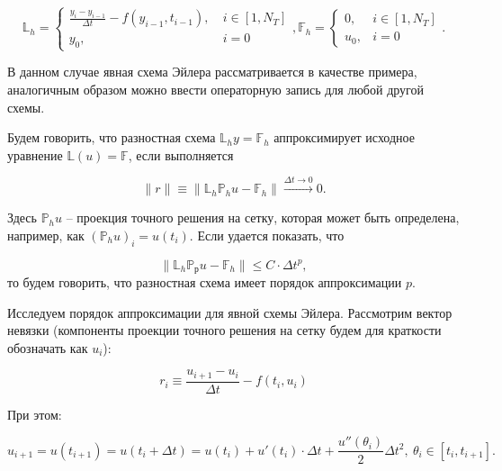 \documentclass[10pt,a4paper]{article}
\begin{document}
	\begin{equation}
		\mathbb{L}_{h} = 
		\begin{cases}
			\frac{y_{i} - y_{i-1}}{\Delta t} - {f}\left(y_{i-1}, t_{i-1}
			\right), \ &i \in \left[1, N_T\right]
			\\
			y_{0}, \  &i = 0
		\end{cases},
		\mathbb{F}_{h} = 
		\begin{cases}
		0, &i \in \left[1, N_T\right]
		\\
		u_{0}, &i = 0
		\end{cases}.
	\end{equation}
	
	В данном случае явная схема Эйлера рассматривается в качестве примера, 
	аналогичным образом можно ввести операторную запись
	для любой другой схемы. 
	
	Будем говорить, что разностная схема $\mathbb{L}_h y =\mathbb{F}_h$ 
	аппроксимирует исходное уравнение $\mathbb{L}\left(u\right)=\mathbb{F}$,
	если выполняется
	
	\begin{equation}
	\parallel r \parallel \equiv 
	\parallel \mathbb{L}_{h}\mathbb{P}_{h}u - \mathbb{F}_{h}\parallel 
	\xrightarrow{\Delta t \to 0} 0.
	\end{equation}
	
	Здесь $\mathbb{P}_{h}u$ -- проекция точного решения на сетку, которая может 
	быть определена, например, как $\left(\mathbb{P}_{h}u\right)_i = u(t_i)$.
	Если удается показать, что 
	
	\begin{equation}
	\parallel \mathbb{L}_{h}\mathbb{P}_{р}u - \mathbb{F}_{h}\parallel 
	\leqslant C\cdot \Delta t^{p},
	\end{equation}
	то будем говорить, что разностная схема имеет порядок аппроксимации $p$.
	
	Исследуем порядок аппроксимации для явной схемы Эйлера. Рассмотрим вектор 
	невязки (компоненты проекции точного решения на сетку будем для краткости 
	обозначать как $u_i$):
	
	\begin{equation}
		r_{i} \equiv \frac{u_{i + 1} - u_{i}}{\Delta t} - f\left(t_{i}, u_{i}
		\right)
	\end{equation}
	
	При этом:
	
	\begin{equation}
		u_{i + 1} = u\left(t_{i + 1}\right) = u\left(t_{i} + \Delta t\right) = 
		u\left(t_{i}\right) + u'\left(t_{i}\right)\cdot \Delta t + 
		\frac{u''\left(\theta_{i}\right)}{2}\Delta t^{2}, \ \theta_{i} \in 
		\left[
		t_{i}, t_{i + 1}\right].
	\end{equation}
	
\end{document}
